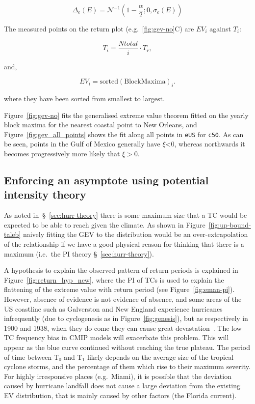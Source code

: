 \begin{equation}
\Delta_e (E) = \mathcal{N}^{-1}(1-\frac{\alpha}{2}; 0, \sigma_e(E))
\end{equation}

The measured points on the return plot (e.g.~\ref{fig:gev-no}C) are $EV_i$ against $T_i$:

\begin{equation}
T_i = \frac{Ntotal}{i} \cdot T_r,
\end{equation}

and,

\begin{equation}
EV_i = \mathrm{sorted(Block Maxima)}_i.
\end{equation}

where they have been sorted from smallest to largest.


Figure~\ref{fig:gev-no} fits the generalised extreme value theorem fitted
on the yearly block maxima for the nearest coastal point to New Orleans,
and Figure~\ref{fig:gev_all_points} shows the fit along all points in \texttt{eUS}
for \texttt{c50}. As can be seen, points in the Gulf of Mexico generally have  $\xi$<0,
whereas northwards it becomes progressively more likely that $\xi>0$.


\subsection{Enforcing an asymptote using potential intensity theory }
\label{sec:evt-limit}

As noted in~§~\ref{sec:hurr-theory} there is some maximum size
that a TC would be expected to be able to reach given
the climate.
As shown in Figure~\ref{fig:up-bound-taleb} naively fitting
the GEV to the distribution would be an over-extrapolation of
the relationship if we have a good physical reason for
thinking that there is a maximum
(i.e.~the PI theory §~\ref{sec:hurr-theory}).

A hypothesis to explain the observed pattern of return periods is explained in
Figure~\ref{fig:return_hyp_new}, where the PI of TCs is used to
explain the flattening of the extreme
value with return period (see Figure~\ref{fig:eman-pi}).
However, absence of evidence is not
 evidence of absence, and some areas of the US
coastline such as Galverston and New England experience hurricanes infrequently
(due to cyclogenesis as in Figure~\ref{fig:genesis}),
but as respectively in 1900 and 1938,
when they do come they can cause great devastation~\cite{emanuel2005divine}.
The low TC frequency bias in CMIP models will exacerbate this problem.
This will appear as the blue curve continued without reaching the true plateau.
The period of time between T$_0$ and T$_1$ likely depends
 on the average size of the tropical cyclone storms,
and the percentage of them which rise to their maximum severity.
For highly irresponsive places (e.g.~Miami),
 it is possible that the deviation caused
by hurricane landfall does not cause a large
deviation from the existing EV distribution,
that is mainly caused by other factors (the Florida current).

